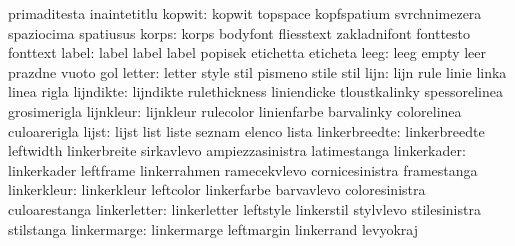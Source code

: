                            primaditesta              inaintetitlu
                   kopwit: kopwit                    topspace
                           kopfspatium               svrchnimezera
                           spaziocima                spatiusus
                    korps: korps                     bodyfont
                           fliesstext                zakladnifont
                           fonttesto                 fonttext
                    label: label                     label
                           label                     popisek
                           etichetta                 eticheta
                     leeg: leeg                      empty
                           leer                      prazdne
                           vuoto                     gol
                   letter: letter                    style
                           stil                      pismeno
                           stile                     stil
                     lijn: lijn                      rule
                           linie                     linka
                           linea                     rigla
                lijndikte: lijndikte                 rulethickness
                           liniendicke               tloustkalinky
                           spessorelinea             grosimerigla
                lijnkleur: lijnkleur                 rulecolor
                           linienfarbe               barvalinky
                           colorelinea               culoarerigla
                    lijst: lijst                     list
                           liste                     seznam
                           elenco                    lista
            linkerbreedte: linkerbreedte             leftwidth
                           linkerbreite              sirkavlevo
                           ampiezzasinistra          latimestanga
              linkerkader: linkerkader               leftframe
                           linkerrahmen              ramecekvlevo
                           cornicesinistra           framestanga
              linkerkleur: linkerkleur               leftcolor
                           linkerfarbe               barvavlevo
                           coloresinistra            culoarestanga
             linkerletter: linkerletter              leftstyle
                           linkerstil                stylvlevo
                           stilesinistra             stilstanga
              linkermarge: linkermarge               leftmargin
                           linkerrand                levyokraj

